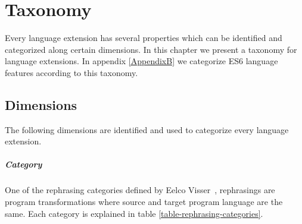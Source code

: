 
\chapter{Taxonomy} %

\label{Chapter4}

 \label{taxonomy}

Every language extension has several properties which can be identified and categorized along certain dimensions. In this chapter we present a taxonomy for language extensions. In appendix \ref{AppendixB} we categorize ES6 language features according to this taxonomy.

\section{Dimensions}
The following dimensions are identified and used to categorize every language extension.

\paragraph{Category}
One of the rephrasing categories defined by Eelco Visser~\cite{Visser2001}, rephrasings are program transformations where source and target program language are the same. Each category is explained in table \ref{table-rephrasing-categories}.

